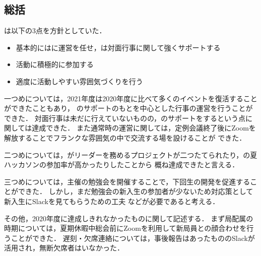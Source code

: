 \subsection*{\newGradeIfKouki{}\thirdGrade{}総括}


\thirdGrade{}は以下の3点を方針としていた．

\begin{itemize}
    \item 基本的には\secondGrade{}に運営を任せ，\thirdGrade{}は対面行事に関して強くサポートする
    \item 活動に積極的に参加する
    \item 適度に活動しやすい雰囲気づくりを行う
\end{itemize}


一つめについては，2021年度は2020年度に比べて多くのイベントを復活することができたこともあり，
\thirdGrade{}のサポートのもと\secondGrade{}を中心とした行事の運営を行うことができた．
対面行事は未だに行えていないものの，\secondGrade{}のサポートをするという点に関しては達成できた．
また通常時の運営に関しては，定例会議終了後にZoomを解放することでフランクな雰囲気の中で交流する場を設けることが
できた．

二つめについては，\thirdGrade{}がリーダーを務めるプロジェクトが二つたてられたり，\thirdGrade{}の夏ハッカソンの参加率が高かったりしたことから
概ね達成できたと言える．

三つめについては，\thirdGrade{}主催の勉強会を開催することで，下回生の開発を促進することができた．
しかし，まだ勉強会の新入生の参加者が少ないため対応策として新入生にSlackを見てもらうための工夫
などが必要であると考える．

その他，2020年度に達成しきれなかったものに関して記述する．
まず局配属の時期については，夏期休暇中総会前にZoomを利用して新局員との顔合わせを行うことができた．
遅刻・欠席連絡については，事後報告はあったもののSlackが活用され，無断欠席者はいなかった．

